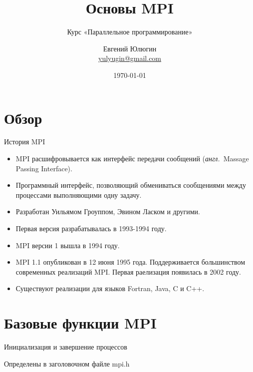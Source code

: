 \documentclass{beamer}
\title{Основы MPI}
\subtitle{Курс «Параллельное программирование»}
\author[Евгений Юлюгин]{Евгений Юлюгин \\ \small{\href{mailto:yulyugin@gmail.com}{yulyugin@gmail.com}}}
\date{\today}
\newcommand{\abbr}{\textit{англ.}\ }
\begin{document}
\begin{frame}
\titlepage
\end{frame}

\section{Обзор}

\begin{frame}
\tableofcontents
\end{frame} 

\begin{frame}{История MPI}

\begin{itemize}
	\item MPI расшифровывается как интерфейс передачи сообщений (\abbr Massage Passing Interface).
	\item Программный интерфейс, позволяющий обмениваться сообщениями между процессами выполняющими одну задачу.
	\item Разработан Уильямом Гроуппом, Эвином Ласком и другими.
	\item Первая версия разрабатывалась в 1993-1994 году.
	\item MPI версии 1 вышла в 1994 году.
	\item MPI 1.1 опубликован в 12 июня 1995 года. Поддерживается большинством современных реализаций MPI. Первая раелизация появилась в 2002 году.
	\item Существуют реализации для языков Fortran, Java, C и C++.
\end{itemize}

\end{frame}

\section{Базовые функции MPI}


\begin{frame}{Инициализация и завершение процессов}

Определены в заголовочном файле mpi.h

\vfill

\initfinalize

\end{frame}
\end{document}
